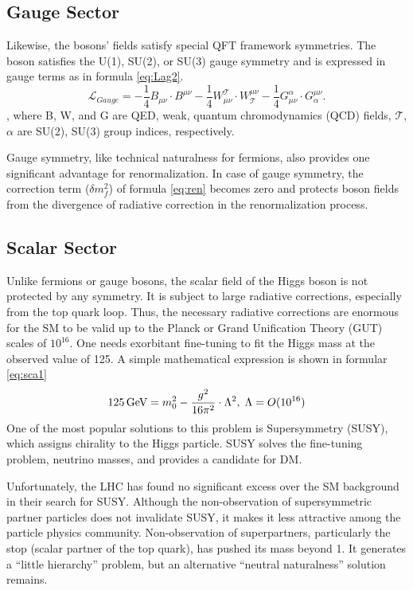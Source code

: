 \subsection{Gauge Sector}
Likewise, the bosons' fields satisfy special QFT framework symmetries.
The boson satisfies the U(1), SU(2), or SU(3) gauge symmetry and is expressed in gauge terms as in formula \ref{eq:Lag2}.
\begin{equation}
\label{eq:Lag2}
	\mathcal{L}_{Gauge} = -\frac{1}{4}B_{\mu\nu}\cdot B^{\mu\nu}-\frac{1}{4}W_{\mu\nu}^{\mathcal{T}}\cdot W^{\mu\nu}_{\mathcal{T}}-\frac{1}{4}G_{\mu\nu}^{\alpha}\cdot G^{\mu\nu}_{\alpha}.
\end{equation}
, where B, W, and G are QED, weak, quantum chromodynamics (QCD) fields, $\mathcal{T}$, $\alpha$ are SU(2), SU(3) group indices, respectively.

Gauge symmetry, like technical naturalness for fermions, also provides one significant advantage for renormalization.
In case of gauge symmetry, the correction term ($\delta m_{f}^2$) of formula \ref{eq:ren} becomes zero and protects boson fields from the divergence of radiative correction in the renormalization process.

\subsection{Scalar Sector}
Unlike fermions or gauge bosons, the scalar field of the Higgs boson is not protected by any symmetry. It is subject to large radiative corrections, especially from the top quark loop.
Thus, the necessary radiative corrections are enormous for the SM to be valid up to the Planck or Grand Unification Theory (GUT) scales of $10^{16}$\GeV.
One needs exorbitant fine-tuning to fit the Higgs mass at the observed value of 125\GeV.
A simple mathematical expression is shown in formular \ref{eq:sca1}
\begin{equation}
\label{eq:sca1}
	125\,\text{Ge\hspace{-.08em}V} = m_{0}^{2}-\frac{g^2}{16\pi^2}\cdot\Lambda^{2},\; \Lambda = O(10^{16})	
\end{equation}
One of the most popular solutions to this problem is Supersymmetry (SUSY), which assigns chirality to the Higgs particle.
SUSY solves the fine-tuning problem, neutrino masses, and provides a candidate for DM.

Unfortunately, the LHC has found no significant excess over the SM background in their search for SUSY\cite{SUSY}.
Although the non-observation of supersymmetric partner particles does not invalidate SUSY, it makes it less attractive among the particle physics community.
Non-observation of superpartners, particularly the stop (scalar partner of the top quark), has pushed its mass beyond 1\TeV.
It generates a ``little hierarchy'' problem, but an alternative ``neutral naturalness'' solution remains.

